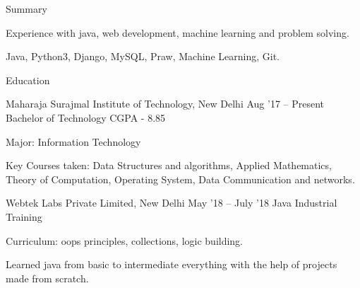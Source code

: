 \documentclass{resume} %
\begin{document}

\begin{rSection}{Summary}
  \begin{rSummarySection}
  {
    \item Experience with java, web development, machine learning and problem solving.
    \item Java, Python3, Django, MySQL, Praw, Machine Learning, Git.
  }
  \end{rSummarySection}
\end{rSection}



\begin{rSection}{Education}
  \begin{rEducationSection}{Maharaja Surajmal Institute of Technology, New Delhi}
                           {Aug '17 -- Present}
                           {Bachelor of Technology}
                           {CGPA - 8.85}
                           
  {
  \item Major: Information Technology
  \item Key Courses taken: Data Structures and algorithms, Applied Mathematics, Theory of Computation, Operating System, Data Communication and networks.
   }                                         
  \end{rEducationSection}
  
  \begin{rEducationSection}{Webtek Labs Private Limited, New Delhi}
                           {May '18 -- July '18}
                           {Java Industrial Training}
                           {}
                           
  {
  \item Curriculum: oops principles, collections, logic building.
  \item Learned java from basic to intermediate everything with the help of projects made from scratch.
   }                                         
  \end{rEducationSection}
  
\end{rSection}
\end{document}
